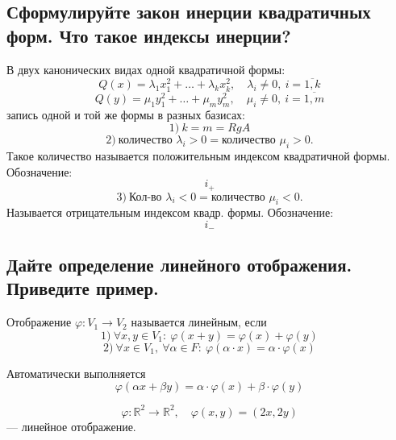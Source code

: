 \subsection{Сформулируйте закон инерции квадратичных форм. Что такое индексы инерции?}

\begin{theorem}
    В двух канонических видах одной квадратичной формы:
    \[
        Q(x) = \lambda_1 x_1^2 + \ldots + \lambda_k x_k^2,
        \quad \lambda_i \neq 0,\ i = \overline{1, k}
    \]
    \[
        Q(y) = \mu_1 y_1^2 + \ldots + \mu_m y_m^2,
        \quad \mu_i \neq 0,\ i = \overline{1, m}
    \]
    запись одной и той же формы в разных базисах:
    \[
        1)\ k = m = Rg A
    \]
    \[
        2)\ \text{количество } \lambda_i > 0 = \text{количество } \mu_i > 0.
    \]
    Такое количество называется положительным индексом квадратичной формы. Обозначение:
    \[
        i_+
    \]
    \[
        3)\ \text{Кол-во } \lambda_i < 0 = \text{количество } \mu_i < 0.
    \]
    Называется отрицательным индексом квадр. формы. Обозначение:
    \[
        i_-
    \]
\end{theorem}

\subsection{Дайте определение линейного отображения. Приведите пример.}
\begin{definition}
    Отображение $\varphi: V_1 \to V_2$ называется линейным, если
    \[
        1)\ \forall x, y \in V_1:\ \varphi(x + y) = \varphi(x) + \varphi(y)
    \]
    \[
        2)\ \forall x \in V_1,\ \forall \alpha \in F:\ \varphi(\alpha \cdot x) = \alpha \cdot \varphi(x)
    \]
\end{definition}

\begin{remark}
    Автоматически выполняется
    \[
        \varphi(\alpha x + \beta y) = \alpha \cdot \varphi(x) + \beta \cdot \varphi(y)
    \]
\end{remark}

\begin{example}
    \[
        \varphi: \mathbb{R}^2 \to \mathbb{R}^2,\quad \varphi(x, y) = (2x, 2y)
    \]
    --- линейное отображение.
\end{example}

